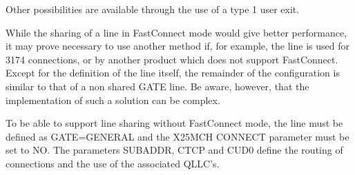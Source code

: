 \documentclass[letterpaper,10pt,english]{sphinxmanual}
\begin{document}
\sphinxAtStartPar
Other possibilities are available through the use of a type 1 user exit.

\sphinxAtStartPar
While the sharing of a line in Fast\sphinxhyphen{}Connect mode would give better performance, it may prove necessary to use another method if, for example, the line is used for 3174 connections, or by another product which does not support Fast\sphinxhyphen{}Connect. Except for the definition of the line itself, the remainder of the configuration is similar to that of a non\sphinxhyphen{} shared GATE line. Be aware, however, that the implementation of such a solution can be complex.

\sphinxAtStartPar
To be able to support line sharing without Fast\sphinxhyphen{}Connect mode, the line must be defined as GATE=GENERAL and the X25MCH CONNECT parameter must be set to NO. The parameters SUBADDR, CTCP and CUD0 define the routing of connections and the use of the associated QLLC’s.
\end{document}
